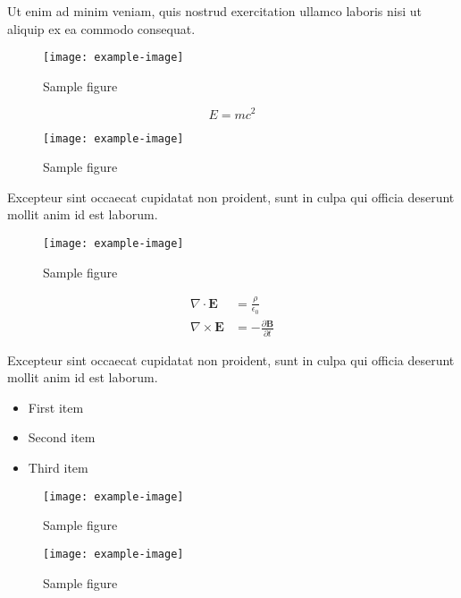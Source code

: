 \documentclass{article}
\begin{document}
Ut enim ad minim veniam, quis nostrud exercitation ullamco laboris nisi ut aliquip ex ea commodo consequat.

\begin{figure}[h]
    \centering
    \texttt{[image: example-image]}
    \caption{Sample figure}
    \label{fig:sample}
\end{figure}

\begin{equation}
    E = mc^2
\end{equation}

\begin{figure}[h]
    \centering
    \texttt{[image: example-image]}
    \caption{Sample figure}
    \label{fig:sample}
\end{figure}

Excepteur sint occaecat cupidatat non proident, sunt in culpa qui officia deserunt mollit anim id est laborum.

\begin{figure}[h]
    \centering
    \texttt{[image: example-image]}
    \caption{Sample figure}
    \label{fig:sample}
\end{figure}

\begin{align}
    \nabla \cdot \mathbf{E} &= \frac{\rho}{\epsilon_0} \\
    \nabla \times \mathbf{E} &= -\frac{\partial \mathbf{B}}{\partial t}
\end{align}

Excepteur sint occaecat cupidatat non proident, sunt in culpa qui officia deserunt mollit anim id est laborum.

\begin{itemize}
\item First item
\item Second item
\item Third item
\end{itemize}

\begin{figure}[h]
    \centering
    \texttt{[image: example-image]}
    \caption{Sample figure}
    \label{fig:sample}
\end{figure}

\begin{figure}[h]
    \centering
    \texttt{[image: example-image]}
    \caption{Sample figure}
    \label{fig:sample}
\end{figure}
\end{document}

